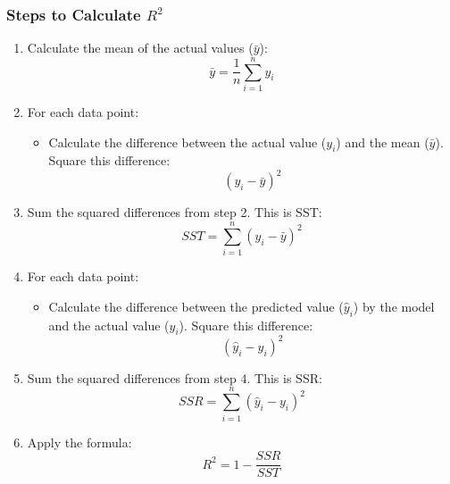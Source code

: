 \subsubsection{Steps to Calculate $R^2$}
\begin{enumerate}
    \item Calculate the mean of the actual values ($\bar{y}$):
    \begin{equation*}
        \bar{y} = \frac{1}{n} \sum_{i=1}^n y_i
    \end{equation*}
    
    \item For each data point:
    \begin{itemize}
        \item Calculate the difference between the actual value ($y_i$) and the mean ($\bar{y}$). Square this difference:
        \begin{equation*}
            (y_i - \bar{y})^2
        \end{equation*}
    \end{itemize}
    
    \item Sum the squared differences from step 2. This is SST:
    \begin{equation*}
        SST = \sum_{i=1}^n (y_i - \bar{y})^2
    \end{equation*}
    
    \item For each data point:
    \begin{itemize}
        \item Calculate the difference between the predicted value ($\hat{y}_i$) by the model and the actual value ($y_i$). Square this difference:
        \begin{equation*}
            (\hat{y}_i - y_i)^2
        \end{equation*}
    \end{itemize}
    
    \item Sum the squared differences from step 4. This is SSR:
    \begin{equation*}
        SSR = \sum_{i=1}^n (\hat{y}_i - y_i)^2
    \end{equation*}
    
    \item Apply the formula:
    \begin{equation*}
        R^2 = 1 - \frac{SSR}{SST}
    \end{equation*}
\end{enumerate}

